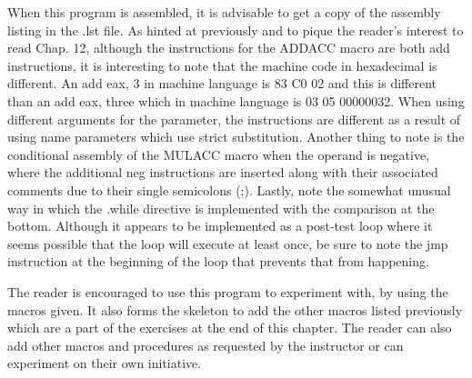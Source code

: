 \documentclass[10pt]{book}
\begin{document}
When this program is assembled, it is advisable to get a copy of the assembly listing in the .lst file. As hinted at previously and to pique the reader's interest to read Chap. 12, although the instructions for the ADDACC macro are both add instructions, it is interesting to note that the machine code in hexadecimal is different. An add eax, 3 in machine language is 83 C0 02 and this is different than an add eax, three which in machine language is 03 05 00000032. When using different arguments for the parameter, the instructions are different as a result of using name parameters which use strict substitution. Another thing to note is the conditional assembly of the MULACC macro when the operand is negative, where the additional neg instructions are inserted along with their associated comments due to their single semicolons (;). Lastly, note the somewhat unusual way in which the .while directive is implemented with the comparison at the bottom. Although it appears to be implemented as a post-test loop where it seems possible that the loop will execute at least once, be sure to note the jmp instruction at the beginning of the loop that prevents that from happening.

The reader is encouraged to use this program to experiment with, by using the macros given. It also forms the skeleton to add the other macros listed previously which are a part of the exercises at the end of this chapter. The reader can also add other macros and procedures as requested by the instructor or can experiment on their own initiative.
\end{document}
